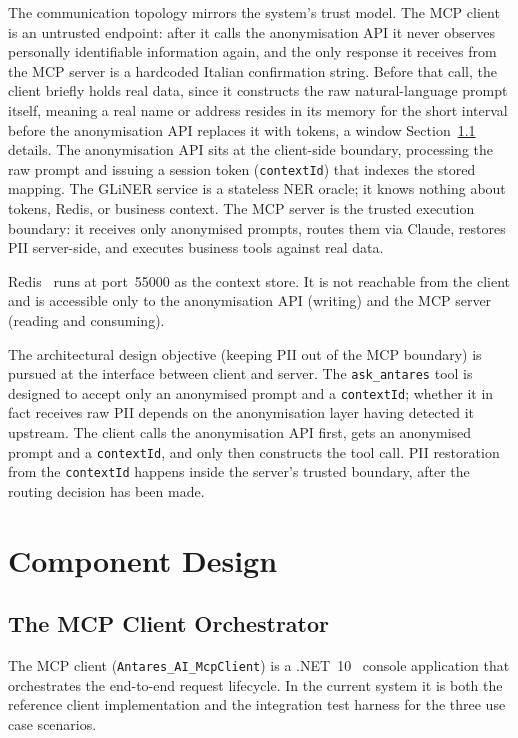 The communication topology mirrors the system's trust model. The MCP client is an untrusted endpoint: after it calls the anonymisation API it never observes personally identifiable information again, and the only response it receives from the MCP server is a hardcoded Italian confirmation string. Before that call, the client briefly holds real data, since it constructs the raw natural-language prompt itself, meaning a real name or address resides in its memory for the short interval before the anonymisation API replaces it with tokens, a window Section~\ref{subsec:arch_mcp_client_orchestrator} details. The anonymisation API sits at the client-side boundary, processing the raw prompt and issuing a session token (\texttt{contextId}) that indexes the stored mapping. The GLiNER service is a stateless NER oracle; it knows nothing about tokens, Redis, or business context. The MCP server is the trusted execution boundary: it receives only anonymised prompts, routes them via Claude, restores PII server-side, and executes business tools against real data.

Redis~\cite{redis2009} runs at port~55000 as the context store. It is not reachable from the client and is accessible only to the anonymisation API (writing) and the MCP server (reading and consuming).

The architectural design objective (keeping PII out of the MCP boundary) is pursued at the interface between client and server. The \texttt{ask\_antares} tool is designed to accept only an anonymised prompt and a \texttt{contextId}; whether it in fact receives raw PII depends on the anonymisation layer having detected it upstream. The client calls the anonymisation API first, gets an anonymised prompt and a \texttt{contextId}, and only then constructs the tool call. PII restoration from the \texttt{contextId} happens inside the server's trusted boundary, after the routing decision has been made.

\section{Component Design}
\label{sec:arch_components}

\subsection{The MCP Client Orchestrator}
\label{subsec:arch_mcp_client_orchestrator}

The MCP client (\texttt{Antares\_AI\_McpClient}) is a .NET~10~\cite{dotnet10} console application that orchestrates the end-to-end request lifecycle. In the current system it is both the reference client implementation and the integration test harness for the three use case scenarios.


